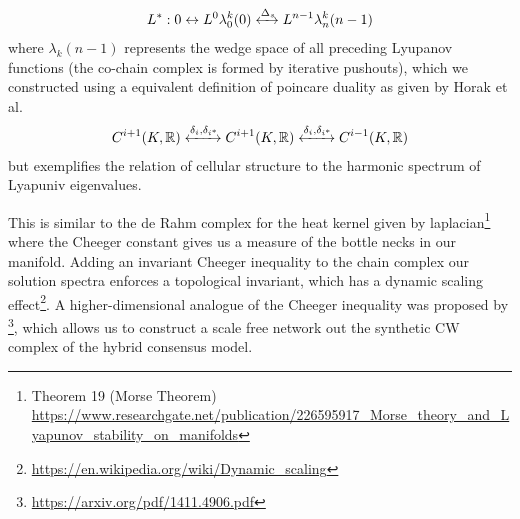 \documentclass{article}
\begin{document}
\begin{equation} \label{eq1}
\begin{split}
L^* : 0 \leftrightarrow L^0 \lambda^k_0(0) \xleftrightarrow{\Delta_s} L^{n-1} \lambda^{k}_n(n-1)
\end{split}
\end{equation}
where $\lambda_k(n-1)$ represents the wedge space of all preceding Lyupanov functions (the co-chain complex is formed by iterative pushouts), which we constructed using a equivalent definition of poincare duality as given by Horak et al.
\begin{equation} \label{eq1}
\begin{split}
C^{i+1}(K, \mathbb{R})  \xleftrightarrow{\delta_i, \delta_{i^*}} C^{i+1}(K, \mathbb{R}) \xleftrightarrow{\delta_i, \delta_{i^*}}  C^{i-1}(K, \mathbb{R})
\end{split}
\end{equation}
but exemplifies the relation of cellular structure to the harmonic spectrum of Lyapuniv eigenvalues.

This is similar to the de Rahm complex for the heat kernel given by laplacian\footnote{Theorem 19 (Morse Theorem) \url{https://www.researchgate.net/publication/226595917_Morse_theory_and_Lyapunov_stability_on_manifolds}} where the Cheeger constant gives us a measure of the bottle necks in our manifold. Adding an invariant Cheeger inequality to the chain complex our solution spectra enforces a topological invariant, which has a dynamic scaling effect\footnote{\url{https://en.wikipedia.org/wiki/Dynamic_scaling}}. A higher-dimensional analogue of the Cheeger inequality was proposed by \footnote{\url{https://arxiv.org/pdf/1411.4906.pdf}}, which allows us to construct a scale free network out the synthetic CW complex of the hybrid consensus model. 
\end{document}

